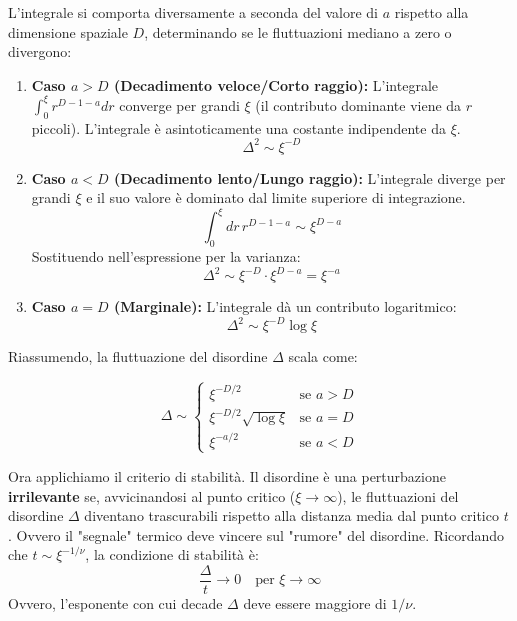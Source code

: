 L'integrale si comporta diversamente a seconda del valore di $a$ rispetto alla dimensione spaziale $D$, determinando se le fluttuazioni mediano a zero o divergono:

\begin{enumerate}
    \item \textbf{Caso $a > D$ (Decadimento veloce/Corto raggio):}
    L'integrale $\int_0^\xi r^{D-1-a} dr$ converge per grandi $\xi$ (il contributo dominante viene da $r$ piccoli). L'integrale è asintoticamente una costante indipendente da $\xi$.
    \begin{equation}
    \Delta^2 \sim \xi^{-D}
    \end{equation}
    
    \item \textbf{Caso $a < D$ (Decadimento lento/Lungo raggio):}
    L'integrale diverge per grandi $\xi$ e il suo valore è dominato dal limite superiore di integrazione.
    \begin{equation}
    \int_0^\xi dr \, r^{D-1-a} \sim \xi^{D-a}
    \end{equation}
    Sostituendo nell'espressione per la varianza:
    \begin{equation}
    \Delta^2 \sim \xi^{-D} \cdot \xi^{D-a} = \xi^{-a}
    \end{equation}
    
    \item \textbf{Caso $a = D$ (Marginale):}
    L'integrale dà un contributo logaritmico:
    \begin{equation}
    \Delta^2 \sim \xi^{-D} \log \xi
    \end{equation}
\end{enumerate}

Riassumendo, la fluttuazione del disordine $\Delta$ scala come:

\begin{tcolorbox}[colback=yellow!10, colframe=yellow!60!colorG, , coltitle=black, title=\textbf{Fluttuazione del Disordine}]
\begin{equation}
\Delta \sim 
\begin{cases} 
\xi^{-D/2} & \text{se } a > D \\
\xi^{-D/2} \sqrt{\log \xi} & \text{se } a = D \\
\xi^{-a/2} & \text{se } a < D
\end{cases}
\end{equation}
\end{tcolorbox}


\noindent Ora applichiamo il criterio di stabilità. Il disordine è una perturbazione \textbf{irrilevante} se, avvicinandosi al punto critico ($\xi \to \infty$), le fluttuazioni del disordine $\Delta$ diventano trascurabili rispetto alla distanza media dal punto critico $t$. Ovvero il "segnale" termico deve vincere sul "rumore" del disordine.
Ricordando che $t \sim \xi^{-1/\nu}$, la condizione di stabilità è:
\begin{equation}
\frac{\Delta}{t} \to 0 \quad \text{per } \xi \to \infty
\end{equation}
Ovvero, l'esponente con cui decade $\Delta$ deve essere maggiore di $1/\nu$.

